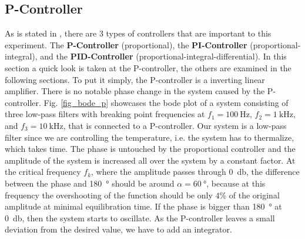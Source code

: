 \documentclass[a4paper,10pt]{article}
\begin{document}
\subsection{P-Controller}
As is stated in \cite{script}, there are 3 types of controllers that are important to this experiment. The \textbf{P-Controller} (proportional), the \textbf{PI-Controller} (proportional-integral), and the \textbf{PID-Controller} (proportional-integral-differential). In this section a quick look is taken at the P-controller, the others are examined in the following sections.
\newline
To put it simply, the P-controller is a inverting linear amplifier. There is no notable phase change in the system caused by the P-controller. Fig. \ref{fig_bode_p} showcases the bode plot of a system consisting of three low-pass filters with breaking point frequencies at $f_1 = \SI{100}{\hertz}$, $f_2 = \SI{1}{\kilo \hertz}$, and $f_3 = \SI{10}{\kilo\hertz}$, that is connected to a P-controller. Our system is a low-pass filter since we are controlling the temperature, i.e. the system has to thermalize, which takes time.
\newline
The phase is untouched by the proportional controller and the amplitude of the system is increased all over the system by a constant factor. At the  critical frequency $f_k$, where the amplitude passes through \SI{0}{\decibel}, the difference between the phase and \SI{180}{\degree} should be around $\alpha = \SI{60}{\degree}$, because at this frequency the overshooting of the function should be only $4\%$ of the original amplitude at minimal equilibration time.\cite{halbleiter} If the phase is bigger than \SI{180}{\degree} at \SI{0}{\decibel}, then the system starts to oscillate. As the P-controller leaves a small deviation from the desired value, we have to add an integrator.
\end{document}
